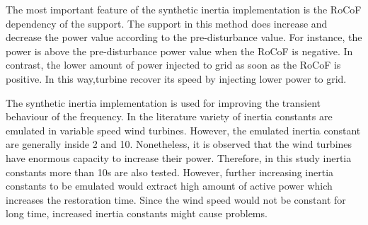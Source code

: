 The most important feature of the synthetic inertia implementation is the RoCoF dependency of the support. The support in this method does increase and decrease the power value according to the pre-disturbance value. For instance, the power is above the pre-disturbance power value when the RoCoF is negative. In contrast, the lower amount of power injected to grid as soon as the RoCoF is positive. In this way,turbine recover its speed by injecting lower power to grid.\par
The synthetic inertia implementation is used for improving the transient behaviour of the frequency. In the literature variety of inertia constants are emulated in variable speed wind turbines. However, the emulated inertia constant are generally inside 2 and 10. Nonetheless, it is observed that the wind turbines have enormous capacity to increase their power. Therefore, in this study inertia constants more than 10s are also tested. However, further increasing inertia constants to be emulated would extract high amount of active power which increases the restoration time. Since the wind speed would not be constant for long time, increased inertia constants might cause problems.\par 
